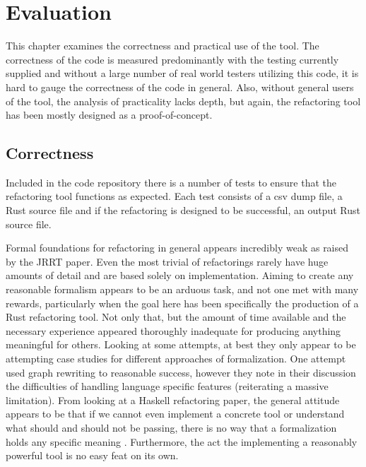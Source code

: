 \chapter{Evaluation}\label{C:eval}
This chapter examines the correctness and practical use of the tool. The correctness of the code is measured predominantly with the testing currently supplied and without a large number of real world testers utilizing this code, it is hard to gauge the correctness of the code in general. Also, without general users of the tool, the analysis of practicality lacks depth, but again, the refactoring tool has been mostly designed as a proof-of-concept.

\section{Correctness}
Included in the code repository there is a number of tests to ensure that the refactoring tool functions as expected. Each test consists of a csv dump file, a Rust source file and if the refactoring is designed to be successful, an output Rust source file. 

Formal foundations for refactoring in general appears incredibly weak as raised by the JRRT paper. Even the most trivial of refactorings rarely have huge amounts of detail and are based solely on implementation. Aiming to create any reasonable formalism appears to be an arduous task, and not one met with many rewards, particularly when the goal here has been specifically the production of a Rust refactoring tool. Not only that, but the amount of time available and the necessary experience appeared thoroughly inadequate for producing anything meaningful for others. Looking at some attempts, at best they only appear to be attempting case studies for different approaches of formalization. One attempt used graph rewriting \cite{graph} to reasonable success, however they note in their discussion the difficulties of handling language specific features (reiterating a massive limitation). From looking at a Haskell refactoring paper, the general attitude appears to be that if we cannot even implement a concrete tool or understand what should and should not be passing, there is no way that a formalization holds any specific meaning \cite{sculthorpe}. Furthermore, the act the implementing a reasonably powerful tool is no easy feat on its own. 

